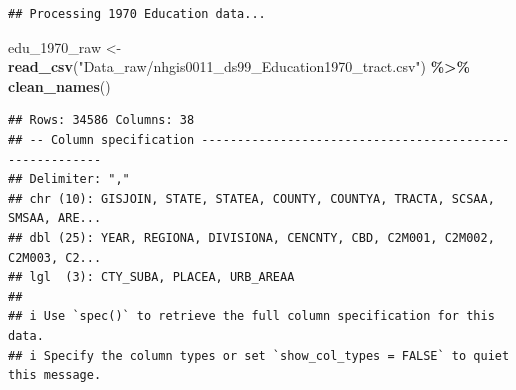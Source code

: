 \documentclass[
]{article}
\newenvironment{Shaded}{\begin{snugshade}}{\end{snugshade}}
\newcommand{\FunctionTok}[1]{\textcolor[rgb]{0.13,0.29,0.53}{\textbf{#1}}}
\newcommand{\NormalTok}[1]{#1}
\newcommand{\OtherTok}[1]{\textcolor[rgb]{0.56,0.35,0.01}{#1}}
\newcommand{\SpecialCharTok}[1]{\textcolor[rgb]{0.81,0.36,0.00}{\textbf{#1}}}
\newcommand{\StringTok}[1]{\textcolor[rgb]{0.31,0.60,0.02}{#1}}
\begin{document}
\begin{verbatim}
## Processing 1970 Education data...
\end{verbatim}

\begin{Shaded}
\begin{Highlighting}[]
\NormalTok{edu\_1970\_raw }\OtherTok{\textless{}{-}} \FunctionTok{read\_csv}\NormalTok{(}\StringTok{"Data\_raw/nhgis0011\_ds99\_Education1970\_tract.csv"}\NormalTok{) }\SpecialCharTok{\%\textgreater{}\%} \FunctionTok{clean\_names}\NormalTok{()}
\end{Highlighting}
\end{Shaded}

\begin{verbatim}
## Rows: 34586 Columns: 38
## -- Column specification --------------------------------------------------------
## Delimiter: ","
## chr (10): GISJOIN, STATE, STATEA, COUNTY, COUNTYA, TRACTA, SCSAA, SMSAA, ARE...
## dbl (25): YEAR, REGIONA, DIVISIONA, CENCNTY, CBD, C2M001, C2M002, C2M003, C2...
## lgl  (3): CTY_SUBA, PLACEA, URB_AREAA
## 
## i Use `spec()` to retrieve the full column specification for this data.
## i Specify the column types or set `show_col_types = FALSE` to quiet this message.
\end{verbatim}
\end{document}

